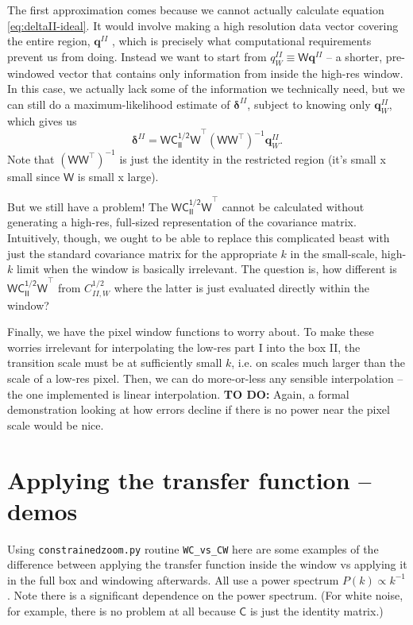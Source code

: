 \documentclass[11pt,a4paper,preprint]{aastex}
\newcommand{\bmath}[1]{\ensuremath{\bm{#1}}}
\renewcommand{\vec}[1]{\bmath{#1}}
\begin{document}
The first approximation comes because we cannot actually calculate
equation \eqref{eq:deltaII-ideal}. It would involve making a high
resolution data vector covering the entire region, $\vec{q}^{II}$ ,
which is precisely what computational requirements prevent us from
doing. Instead we want to start from $q^{II}_W \equiv
\mathsf{W}\vec{q}^{II}$ -- a shorter, pre-windowed vector that
contains only information from inside the high-res window. In this
case, we actually lack some of the information we technically need,
but we can still do a maximum-likelihood estimate of
$\vec{\delta}^{II}$, subject to knowing only $\vec{q}^{II}_W$, which
gives us
\begin{equation}
\vec{\delta}^{II} = \mathsf{WC_{II}^{1/2}W}^{\top} (\mathsf{WW}^{\top})^{-1} \vec{q}^{II}_W \textrm{.}
\end{equation}
Note that $(\mathsf{WW}^{\top})^{-1}$ is just the identity in the
restricted region (it's small x small since $\mathsf{W}$ is small x large). 

But we still have a problem! The $\mathsf{WC_{II}^{1/2}W}^{\top}$
cannot be calculated without generating a high-res, full-sized
representation of the covariance matrix. Intuitively, though, we ought
to be able to replace this complicated beast with just the standard
covariance matrix for the appropriate $k$ in the small-scale, high-$k$
limit when the window is basically irrelevant. The question is, how
different is $\mathsf{WC_{II}^{1/2}W}^{\top}$ from $C_{II,W}^{1/2}$
where the latter is just evaluated directly within the window?



Finally, we have the pixel window functions to worry about. To make
these worries irrelevant for interpolating the low-res part I into the
box II, the transition scale must be at sufficiently small $k$,
i.e. on scales much larger than the scale of a low-res pixel.  Then,
we can do more-or-less any sensible interpolation -- the one
implemented is linear interpolation. {\bf TO DO: } Again, a formal
demonstration looking at how errors decline if there is no power near
the pixel scale would be nice.

\section{Applying the transfer function -- demos}

Using {\tt constrainedzoom.py} routine {\tt WC\_vs\_CW} here are some
examples of the difference between applying the transfer function
inside the window vs applying it in the full box and windowing
afterwards. All use a power spectrum $P(k) \propto k^{-1}$. Note there
is a significant dependence on the power spectrum. (For white noise,
for example, there is no problem at all because $\mathsf{C}$ is just
the identity matrix.)
\end{document}
